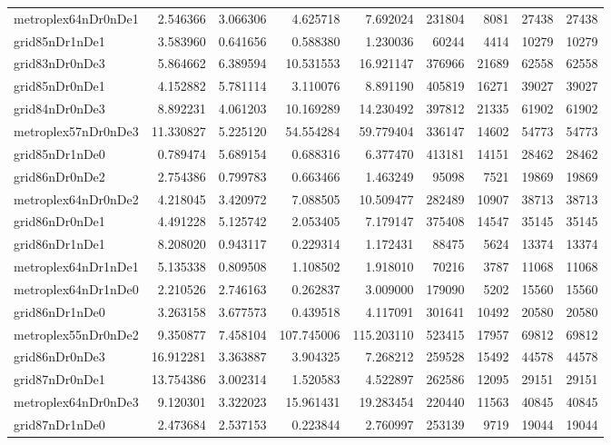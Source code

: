 \begin{longtable}{|l|r|r|r|r|r|r|r|r|}
metroplex64nDr0nDe1 & 2.546366 & 3.066306 & 4.625718 & 7.692024 & 231804 & 8081 & 27438 & 27438 \\
grid85nDr1nDe1 & 3.583960 & 0.641656 & 0.588380 & 1.230036 & 60244 & 4414 & 10279 & 10279 \\
grid83nDr0nDe3 & 5.864662 & 6.389594 & 10.531553 & 16.921147 & 376966 & 21689 & 62558 & 62558 \\
grid85nDr0nDe1 & 4.152882 & 5.781114 & 3.110076 & 8.891190 & 405819 & 16271 & 39027 & 39027 \\
grid84nDr0nDe3 & 8.892231 & 4.061203 & 10.169289 & 14.230492 & 397812 & 21335 & 61902 & 61902 \\
metroplex57nDr0nDe3 & 11.330827 & 5.225120 & 54.554284 & 59.779404 & 336147 & 14602 & 54773 & 54773 \\
grid85nDr1nDe0 & 0.789474 & 5.689154 & 0.688316 & 6.377470 & 413181 & 14151 & 28462 & 28462 \\
grid86nDr0nDe2 & 2.754386 & 0.799783 & 0.663466 & 1.463249 & 95098 & 7521 & 19869 & 19869 \\
metroplex64nDr0nDe2 & 4.218045 & 3.420972 & 7.088505 & 10.509477 & 282489 & 10907 & 38713 & 38713 \\
grid86nDr0nDe1 & 4.491228 & 5.125742 & 2.053405 & 7.179147 & 375408 & 14547 & 35145 & 35145 \\
grid86nDr1nDe1 & 8.208020 & 0.943117 & 0.229314 & 1.172431 & 88475 & 5624 & 13374 & 13374 \\
metroplex64nDr1nDe1 & 5.135338 & 0.809508 & 1.108502 & 1.918010 & 70216 & 3787 & 11068 & 11068 \\
metroplex64nDr1nDe0 & 2.210526 & 2.746163 & 0.262837 & 3.009000 & 179090 & 5202 & 15560 & 15560 \\
grid86nDr1nDe0 & 3.263158 & 3.677573 & 0.439518 & 4.117091 & 301641 & 10492 & 20580 & 20580 \\
metroplex55nDr0nDe2 & 9.350877 & 7.458104 & 107.745006 & 115.203110 & 523415 & 17957 & 69812 & 69812 \\
grid86nDr0nDe3 & 16.912281 & 3.363887 & 3.904325 & 7.268212 & 259528 & 15492 & 44578 & 44578 \\
grid87nDr0nDe1 & 13.754386 & 3.002314 & 1.520583 & 4.522897 & 262586 & 12095 & 29151 & 29151 \\
metroplex64nDr0nDe3 & 9.120301 & 3.322023 & 15.961431 & 19.283454 & 220440 & 11563 & 40845 & 40845 \\
grid87nDr1nDe0 & 2.473684 & 2.537153 & 0.223844 & 2.760997 & 253139 & 9719 & 19044 & 19044 \\

\end{longtable}
